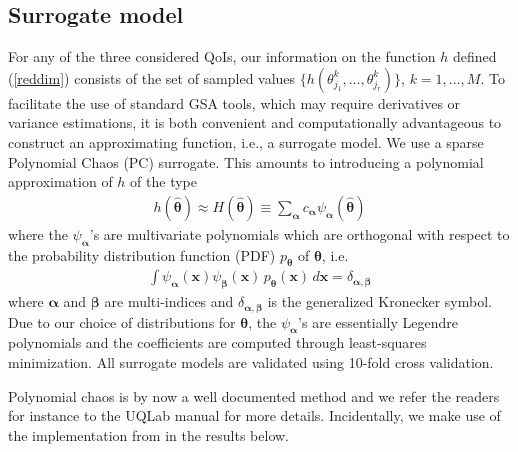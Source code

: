 \subsection{Surrogate model}
For any of the three considered QoIs, our information on the function $h$ defined (\ref{reddim}) consists of the set of sampled values $\{ h(\theta_{j_1}^k, \dots, \theta_{j_r}^k)\}$, $k=1, \dots, M$.  To facilitate the use of standard GSA tools, which may require derivatives or variance estimations, it is both convenient and computationally advantageous to construct an approximating function, i.e., a surrogate model. 
We use a sparse Polynomial Chaos (PC) surrogate. This amounts to introducing a polynomial approximation of $h$ of the type
\begin{eqnarray}
h(\hat{\boldsymbol{\theta}}) \approx H(\hat{\boldsymbol{\theta}}) \equiv \sum_{\boldsymbol{\alpha}} c_{\boldsymbol{\alpha}} \psi_{\boldsymbol{\alpha}}(\hat{\boldsymbol{\theta}}) \label{pce}
\end{eqnarray}
where the $\psi_{\boldsymbol{\alpha}}$'s are multivariate polynomials which are orthogonal with respect to the probability distribution function (PDF) $p_{\boldsymbol{\theta}}$ of $\boldsymbol{\theta}$, i.e.
\begin{eqnarray}
\int \psi_{\boldsymbol{\alpha}}(\mathbf x) \psi_{\boldsymbol{\beta}}(\mathbf x)\, p_{\boldsymbol{\theta}}(\mathbf x) \, d\mathbf{x} = \delta _{\boldsymbol{\alpha},\boldsymbol{\beta}} \label{ortho}
\end{eqnarray}
where $\boldsymbol{\alpha}$ and $\boldsymbol{\beta}$ are multi-indices and $\delta _{\boldsymbol{\alpha},\boldsymbol{\beta}}$ is the generalized Kronecker symbol. Due to our choice of distributions for $\boldsymbol{\theta}$, the $\psi_{\boldsymbol{\alpha}}$'s are essentially Legendre polynomials and the coefficients are computed through least-squares minimization. All surrogate models are validated using 10-fold cross validation.

Polynomial chaos is by now a well documented method and we refer the readers for instance to the  UQLab \cite{uqlab} manual for more details. Incidentally, we make use of the implementation from  \cite{uqlab} in the results below. 



